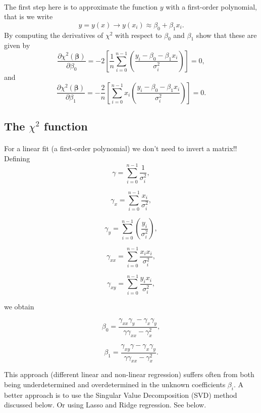 \documentclass[%
oneside,                 %
final,                   %
10pt]{article}
\begin{document}
\paragraph{}
The first step here is to approximate the function $y$ with a first-order polynomial, that is we write
\[
y=y(x) \rightarrow y(x_i) \approx \beta_0+\beta_1 x_i.
\]
By computing the derivatives of $\chi^2$ with respect to $\beta_0$ and $\beta_1$ show that these are given by
\[
\frac{\partial \chi^2(\bm{\beta})}{\partial \beta_0} = -2\left[ \frac{1}{n}\sum_{i=0}^{n-1}\left(\frac{y_i-\beta_0-\beta_1x_{i}}{\sigma_i^2}\right)\right]=0,
\]
and
\[
\frac{\partial \chi^2(\bm{\beta})}{\partial \beta_1} = -\frac{2}{n}\left[ \sum_{i=0}^{n-1}x_i\left(\frac{y_i-\beta_0-\beta_1x_{i}}{\sigma_i^2}\right)\right]=0.
\]



\subsection*{The $\chi^2$ function}

\paragraph{}

For a linear fit (a first-order polynomial) we don't need to invert a matrix!!  
Defining
\[
\gamma =  \sum_{i=0}^{n-1}\frac{1}{\sigma_i^2},
\]

\[
\gamma_x =  \sum_{i=0}^{n-1}\frac{x_{i}}{\sigma_i^2},
\]

\[
\gamma_y = \sum_{i=0}^{n-1}\left(\frac{y_i}{\sigma_i^2}\right),
\]

\[
\gamma_{xx} =  \sum_{i=0}^{n-1}\frac{x_ix_{i}}{\sigma_i^2},
\]

\[
\gamma_{xy} = \sum_{i=0}^{n-1}\frac{y_ix_{i}}{\sigma_i^2},
\]

we obtain

\[
\beta_0 = \frac{\gamma_{xx}\gamma_y-\gamma_x\gamma_y}{\gamma\gamma_{xx}-\gamma_x^2},
\]

\[
\beta_1 = \frac{\gamma_{xy}\gamma-\gamma_x\gamma_y}{\gamma\gamma_{xx}-\gamma_x^2}.
\]

This approach (different linear and non-linear regression) suffers
often from both being underdetermined and overdetermined in the
unknown coefficients $\beta_i$.  A better approach is to use the
Singular Value Decomposition (SVD) method discussed below. Or using
Lasso and Ridge regression. See below.
\end{document}
